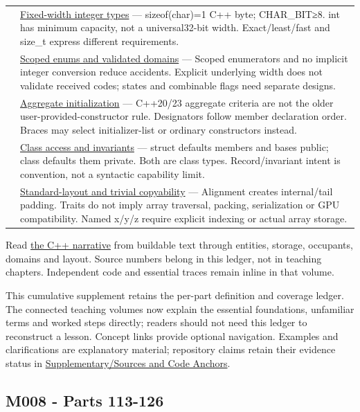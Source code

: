 {\begin{longtable}[]{@{}
  >{\raggedright\arraybackslash}p{}
  >{\raggedright\arraybackslash}p{}@{}}
108 & \hyperref[appendix-cc04044b5782]{Fixed-width integer types} --- sizeof(char)=1 C++ byte; CHAR\_BIT≥8. int has minimum capacity, not a universal32-bit width. Exact/least/fast and size\_t express different requirements. \\
109 & \hyperref[appendix-23640fcee147]{Scoped enums and validated domains} --- Scoped enumerators and no implicit integer conversion reduce accidents. Explicit underlying width does not validate received codes; states and combinable flags need separate designs. \\
110 & \hyperref[appendix-b7174c179542]{Aggregate initialization} --- C++20/23 aggregate criteria are not the older user-provided-constructor rule. Designators follow member declaration order. Braces may select initializer-list or ordinary constructors instead. \\
111 & \hyperref[appendix-8e5214819615]{Class access and invariants} --- struct defaults members and bases public; class defaults them private. Both are class types. Record/invariant intent is convention, not a syntactic capability limit. \\
112 & \hyperref[appendix-958870a64c53]{Standard-layout and trivial copyability} --- Alignment creates internal/tail padding. Traits do not imply array traversal, packing, serialization or GPU compatibility. Named x/y/z require explicit indexing or actual array storage. \\
\end{longtable}
}

Read \href{Continuous\%20Notes/Computing\%20Foundations\%20-\%20From\%20Bits\%20to\%20C++\%20and\%20Systems\%20APIs}{the C++ narrative} from buildable text through entities, storage, occupants, domains and layout. Source numbers belong in this ledger, not in teaching chapters. Independent code and essential traces remain inline in that volume.

This cumulative supplement retains the per-part definition and coverage ledger. The connected teaching volumes now explain the essential foundations, unfamiliar terms and worked steps directly; readers should not need this ledger to reconstruct a lesson. Concept links provide optional navigation. Examples and clarifications are explanatory material; repository claims retain their evidence status in \hyperref[appendix-a103e7846d21]{Supplementary/Sources and Code Anchors}.

\subsection{M008 - Parts 113-126}\label{m008---parts-113-126}

